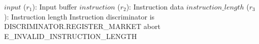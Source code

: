 \begin{algorithm}
\caption{RegisterMarket}
\begin{algorithmic}
\INPUT $input$ ($r_1$): Input buffer
\INPUT $instruction$ ($r_2$): Instruction data
\INPUT $instruction\_length$ ($r_3$): Instruction length
\REQUIRE Instruction discriminator is DISCRIMINATOR.REGISTER\_MARKET
    \STATE abort E\_INVALID\_INSTRUCTION\_LENGTH
  \ENDIF
\ENDPROCEDURE
\end{algorithmic}
\end{algorithm}
